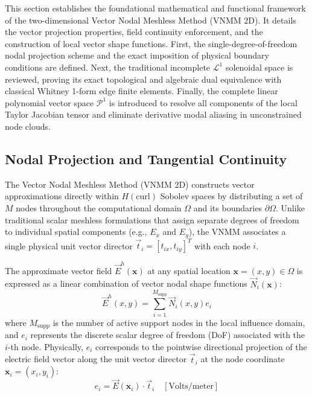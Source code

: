 \documentclass[preprint,12pt]{elsarticle}
\begin{document}
This section establishes the foundational mathematical and functional framework of the two-dimensional Vector Nodal Meshless Method (VNMM 2D). It details the vector projection properties, field continuity enforcement, and the construction of local vector shape functions. First, the single-degree-of-freedom nodal projection scheme and the exact imposition of physical boundary conditions are defined. Next, the traditional incomplete $\mathcal{L}^1$ solenoidal space is reviewed, proving its exact topological and algebraic dual equivalence with classical Whitney 1-form edge finite elements. Finally, the complete linear polynomial vector space $\mathcal{P}^1$ is introduced to resolve all components of the local Taylor Jacobian tensor and eliminate derivative modal aliasing in unconstrained node clouds.

\subsection{Nodal Projection and Tangential Continuity}
\label{subsec:nodal_projection}

The Vector Nodal Meshless Method (VNMM 2D) \cite{ortiz2021nodal, ortiz2023tese} constructs vector approximations directly within $H(\mathrm{curl})$ Sobolev spaces by distributing a set of $M$ nodes throughout the computational domain $\Omega$ and its boundaries $\partial\Omega$. Unlike traditional scalar meshless formulations that assign separate degrees of freedom to individual spatial components (e.g., $E_x$ and $E_y$), the VNMM associates a single physical unit vector director $\vec{t}_i = [t_{ix}, t_{iy}]^T$ with each node $i$.

The approximate vector field $\vec{E}^h(\mathbf{x})$ at any spatial location $\mathbf{x} = (x, y) \in \Omega$ is expressed as a linear combination of vector nodal shape functions $\vec{N}_i(\mathbf{x})$:
\begin{equation}
\vec{E}^h(x, y) = \sum_{i=1}^{M_{\text{supp}}} \vec{N}_i(x, y) e_i
\label{eq:field_approx_vnmm}
\end{equation}
where $M_{\text{supp}}$ is the number of active support nodes in the local influence domain, and $e_i$ represents the discrete scalar degree of freedom (DoF) associated with the $i$-th node. Physically, $e_i$ corresponds to the pointwise directional projection of the electric field vector along the unit vector director $\vec{t}_i$ at the node coordinate $\mathbf{x}_i = (x_i, y_i)$:
\begin{equation}
e_i = \vec{E}(\mathbf{x}_i) \cdot \vec{t}_i \quad [\text{Volts/meter}]
\label{eq:dof_projection_definition}
\end{equation}
\end{document}
